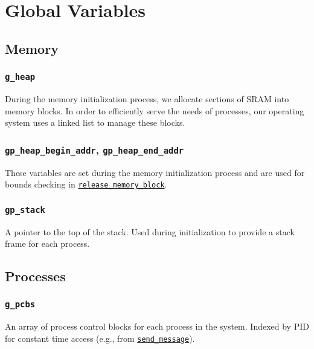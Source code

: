 \documentclass[12pt]{report}
\begin{document}
\appendix


\chapter{Global Variables}

\section{Memory}

\subsection{\texttt{g_heap}}

During the memory initialization process, we allocate sections of SRAM into memory blocks. In order to efficiently serve the needs of processes, our operating system uses a linked list to manage these blocks.


\subsection{\texttt{gp_heap_begin_addr}, \texttt{gp_heap_end_addr}}

These variables are set during the memory initialization process and are used for bounds checking in \hyperref[alg:releasingmemoryblocks]{\texttt{release_memory_block}}.

\subsection{\texttt{gp_stack}}

A pointer to the top of the stack. Used during initialization to provide a stack frame for each process.

\section{Processes}

\subsection{\texttt{g_pcbs}}

An array of process control blocks for each process in the system. Indexed by PID for constant time access (e.g., from \hyperref[alg:sendingmessages]{\texttt{send_message}}).
\end{document}
